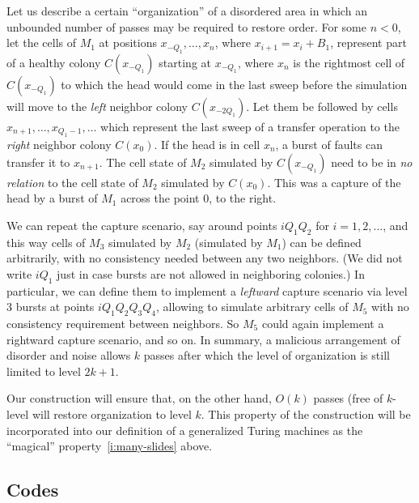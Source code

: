\documentclass[11pt]{memoir}
\theoremstyle{definition} %
\def\B{B}
\newcommand{\Q}{Q} %
\begin{document}
\begin{example}\label{xpl:unbounded}
  Let us describe a certain ``organization'' of a disordered area in which an unbounded number of passes
  may be required to restore order.
For some \( n<0 \), let the cells of \( M_{1} \) at positions
\( x_{-\Q_{1}},\dots,x_{n} \), where \( x_{i+1}=x_{i}+\B_{1} \),
represent part of a healthy colony \( C(x_{-\Q_{1}}) \) starting at \( x_{-\Q_{1}} \), where \( x_{n} \)
is the rightmost cell of \( C(x_{-\Q_{1}}) \)
to which the head would come in the last sweep before
the simulation will move to the \emph{left} neighbor colony \( C(x_{-2\Q_{1}}) \).
Let them be followed by cells \( x_{n+1},\dots, x_{\Q_{1}-1},\dots\)
which represent the last sweep of a transfer operation to the \emph{right} neighbor colony \( C(x_{0}) \).
If the head is in cell \( x_{n} \), a burst of faults can transfer it to \( x_{n+1} \).
The cell state of \( M_{2} \) simulated by \( C(x_{-\Q_{1}}) \) need to be in \emph{no relation} to 
the cell state of \( M_{2} \) simulated by \( C(x_{0}) \).
This was a capture of the head by a burst of \( M_{1} \) across the point 0, to the right.

We can repeat the capture scenario, say around points \( i \Q_{1}\Q_{2} \) for \( i=1,2,\dots \),
and this way cells of \( M_{3} \) simulated by \( M_{2} \) (simulated by \( M_{1} \))
can be defined arbitrarily, with no consistency needed between any two neighbors.
(We did not write \( i \Q_{1} \) just in case bursts are not allowed in neighboring colonies.)
In particular, we can define them to implement a \emph{leftward} capture scenario
via level 3 bursts at points \( i \Q_{1}\Q_{2}\Q_{3}\Q_{4} \), allowing to simulate arbitrary cells of \( M_{5} \)
with no consistency requirement between neighbors.
So \( M_{5} \) could again implement a rightward capture scenario, and so on.
In summary, a malicious arrangement of disorder and noise allows \( k \) passes
after which the level of organization is still limited to level \( 2 k + 1 \).
\end{example}

Our construction will ensure that, on the other hand,
\( O(k) \) passes (free of \( k \)-level will restore organization to level \( k \).
This property of the construction will be incorporated into our definition of a generalized
Turing machines as the ``magical'' property~\eqref{i:many-slides} above.

\subsection{Codes}\label{sec:codes}
\end{document}
